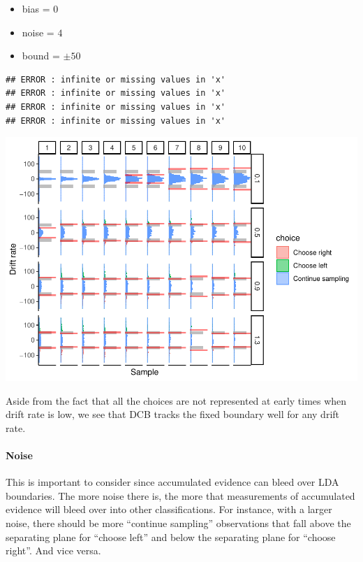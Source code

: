 \documentclass[
]{book}
\providecommand{\tightlist}{%
  \setlength{\itemsep}{0pt}\setlength{\parskip}{0pt}}
\begin{document}
\begin{itemize}
\tightlist
\item
  bias = \(0\)
\item
  noise = \(4\)
\item
  bound = \(\pm 50\)
\end{itemize}

\begin{verbatim}
## ERROR : infinite or missing values in 'x' 
## ERROR : infinite or missing values in 'x' 
## ERROR : infinite or missing values in 'x' 
## ERROR : infinite or missing values in 'x'
\end{verbatim}

\includegraphics{LateNightBayes_files/figure-latex/unnamed-chunk-7-1.pdf}

Aside from the fact that all the choices are not represented at early times when drift rate is low, we see that DCB tracks the fixed boundary well for any drift rate.

\hypertarget{noise}{%
\paragraph*{Noise}\label{noise}}

This is important to consider since accumulated evidence can bleed over LDA boundaries. The more noise there is, the more that measurements of accumulated evidence will bleed over into other classifications. For instance, with a larger noise, there should be more ``continue sampling'' observations that fall above the separating plane for ``choose left'' and below the separating plane for ``choose right''. And vice versa.
\end{document}
